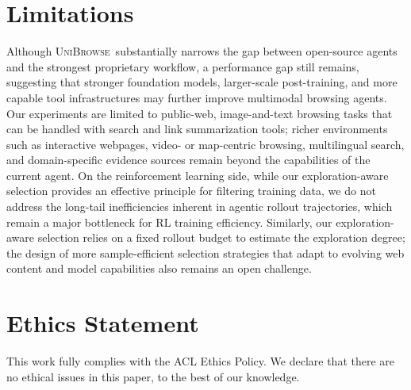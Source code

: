 \documentclass[11pt]{article}
\newcommand{\modelname}{\textsc{UniBrowse}}
\begin{document}
\section*{Limitations}
Although \modelname\ substantially narrows the gap between open-source agents and the strongest proprietary workflow, a performance gap still remains, suggesting that stronger foundation models, larger-scale post-training, and more capable tool infrastructures may further improve multimodal browsing agents. Our experiments are limited to public-web, image-and-text browsing tasks that can be handled with search and link summarization tools; richer environments such as interactive webpages, video- or map-centric browsing, multilingual search, and domain-specific evidence sources remain beyond the capabilities of the current agent. On the reinforcement learning side, while our exploration-aware selection provides an effective principle for filtering training data, we do not address the long-tail inefficiencies inherent in agentic rollout trajectories, which remain a major bottleneck for RL training efficiency. Similarly, our exploration-aware selection relies on a fixed rollout budget to estimate the exploration degree; the design of more sample-efficient selection strategies that adapt to evolving web content and model capabilities also remains an open challenge.


\section*{Ethics Statement}
This work fully complies with the ACL Ethics Policy.
We declare that there are no ethical issues in this paper, to the best of our knowledge.







\clearpage
\end{document}
